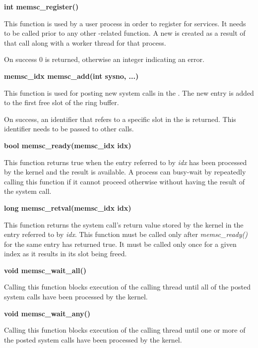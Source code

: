 {\parindent0pt %

\textbf{int memsc\_register()}

{\addtolength{\leftskip}{5mm}

This function is used by a user process in order to register for \memsc
services. It needs to be called prior to any other \memsc-related function. A
new \sysp is created as a result of that call along with a worker thread for
that process.

On success 0 is returned, otherwise an integer indicating an error.

}

\textbf{memsc\_idx memsc\_add(int sysno, ...)}

{\addtolength{\leftskip}{5mm}

This function is used for posting new system calls in the \sysp. The new entry
is added to the first free slot of the ring buffer.

On success, an identifier that refers to a specific slot in the \sysp is
returned. This identifier needs to be passed to other \lib calls.

}

\textbf{bool memsc\_ready(memsc\_idx idx)}

{\addtolength{\leftskip}{5mm}

This function returns true when the entry referred to by \emph{idx} has been
processed by the kernel and the result is available. A process can busy-wait by
repeatedly calling this function if it cannot proceed otherwise without having
the result of the system call.

}

\textbf{long memsc\_retval(memsc\_idx idx)}

{\addtolength{\leftskip}{5mm}

This function returns the system call's return value stored by the kernel in
the entry referred to by \emph{idx}. This function must be called only after
\emph{memsc\_ready()} for the same entry has returned true. It must be called
only once for a given index as it results in its slot being freed.

}

\textbf{void memsc\_wait\_all()}

{\addtolength{\leftskip}{5mm}

Calling this function blocks execution of the calling thread until all of the
posted system calls have been processed by the kernel.

}

\textbf{void memsc\_wait\_any()}

{\addtolength{\leftskip}{5mm}

Calling this function blocks execution of the calling thread until one or more
of the posted system calls have been processed by the kernel.

}

} %


